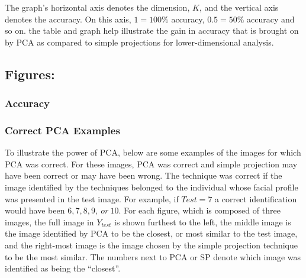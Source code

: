 \documentclass[12pt]{article}
\begin{document}
	The graph's horizontal axis denotes the dimension, $ K $, and the vertical axis denotes the accuracy. On this axis, $ 1=100\% $ accuracy, $ 0.5=50\% $ accuracy and so on. the table and graph help illustrate the gain in accuracy that is brought on by PCA as compared to simple projections for lower-dimensional analysis. 
	
	\subsection{Figures:}
	\subsubsection{Accuracy}
	\begin{center}
	\end{center}
	
	\begin{center}
	\end{center}

	\subsubsection{Correct PCA Examples}
	To illustrate the power of PCA, below are some examples of the images for which PCA was correct. For these images, PCA was correct and simple projection may have been correct or may have been wrong. The technique was correct if the image identified by the techniques belonged to the individual whose facial profile was presented in the test image. For example, if $ Test=7 $ a correct identification would have been $ 6,7,8,9,\ or\ 10 $. For each figure, which is composed of three images, the full image in $ Y_{test} $ is shown furthest to the left, the middle image is the image identified by PCA to be the closest, or most similar to the test image, and the right-most image is the image chosen by the simple projection technique to be the most similar. The numbers next to PCA or SP denote which image was identified as being the ``closest''.
		\begin{center}
		\end{center}
		\begin{center}
		\end{center}
\end{document}
